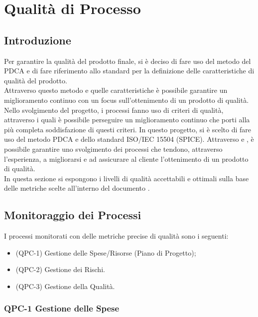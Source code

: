 \section{Qualità di Processo}

\subsection{Introduzione}

Per garantire la qualità del prodotto finale, si è deciso di fare uso del metodo del PDCA  e di fare riferimento allo standard  per la definizione delle caratteristiche di qualità del prodotto. \\
Attraverso questo metodo e quelle caratteristiche è possibile garantire un miglioramento continuo con un focus sull'ottenimento di un prodotto di qualità. \\

Nello svolgimento del progetto, i processi fanno uso di criteri di qualità, attraverso i quali è possibile perseguire un miglioramento continuo che porti alla più completa soddisfazione di questi criteri. In questo progetto, si è scelto di fare uso del metodo PDCA e dello standard ISO/IEC 15504 (SPICE). Attraverso  e , è possibile garantire uno svolgimento dei processi che tendono, attraverso l'esperienza, a migliorarsi e ad assicurare al cliente l'ottenimento di un prodotto di qualità.\\
In questa sezione si espongono i livelli di qualità accettabili e ottimali sulla base delle metriche scelte all'interno del documento . \\

\subsection{Monitoraggio dei Processi}

I processi monitorati con delle metriche precise di qualità sono i seguenti:

\begin{itemize}
	\item (QPC-1) Gestione delle Spese/Risorse (Piano di Progetto);
	\item (QPC-2) Gestione dei Rischi.
	\item (QPC-3) Gestione della Qualità.
\end{itemize}

	\subsubsection{QPC-1 Gestione delle Spese}


